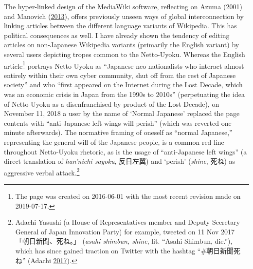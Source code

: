 \documentclass[10pt,british,A4paper,,openany]{memoir}
\begin{document}
The hyper-linked design of the MediaWiki software, reflecting on Azuma
(\protect\hyperlink{ref-azuma_otaku:_2001}{2001}) and Manovich
(\protect\hyperlink{ref-manovich_software_2013}{2013}), offers
previously unseen ways of global interconnection by linking articles
between the different language variants of Wikipedia. This has political
consequences as well. I have already shown the tendency of editing
articles on non-Japanese Wikipedia variants (primarily the English
variant) by several users depicting tropes common to the Netto-Uyoku.
Whereas the English article\footnote{The page was created on 2016-06-01
  with the most recent revision made on 2019-07-17.} portrays
Netto-Uyoku as ``Japanese neo-nationalists who interact almost entirely
within their own cyber community, shut off from the rest of Japanese
society'' and who ``first appeared on the Internet during the Lost
Decade, which was an economic crisis in Japan from the 1990s to 2010s''
(perpetuating the idea of Netto-Uyoku as a disenfranchised by-product of
the Lost Decade), on November 11, 2018 a user by the name of `Normal
Japanese' replaced the page contents with ``anti-Japanese left wings
will perish'' (which was reverted one minute afterwards). The normative
framing of oneself as ``normal Japanese,'' representing the general will
of the Japanese people, is a common red line throughout Netto-Uyoku
rhetoric, as is the usage of ``anti-Japanese left wings'' (a direct
translation of \emph{han'nichi sayoku}, 反日左翼) and `perish'
(\emph{shine}, 死ね) as aggressive verbal attack.\footnote{Adachi
  Yasushi (a House of Representatives member and Deputy Secretary
  General of Japan Innovation Party) for example, tweeted on 11 Nov 2017
  「朝日新聞、死ね。」 (\emph{asahi shimbun, shine}, lit. ``Asahi
  Shimbun, die.''), which has since gained traction on Twitter with the
  hashtag ``\#朝日新聞死ね'' (Adachi
  \protect\hyperlink{ref-adachi_eng._2017}{2017}).}
\end{document}
